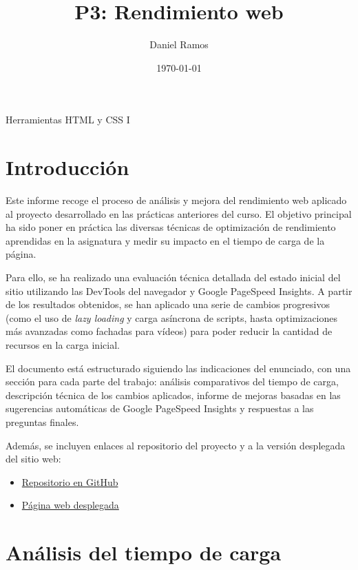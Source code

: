 \documentclass{article}
\title{P3: Rendimiento web}
\author{Daniel Ramos}
\date{\today}
\begin{document}
\maketitle

\begin{center}
    \large Herramientas HTML y CSS I
\end{center}

\newpage

\tableofcontents

\newpage

\section*{Introducción}

Este informe recoge el proceso de análisis y mejora del rendimiento web aplicado al proyecto desarrollado en las prácticas anteriores del curso. El objetivo principal ha sido poner en práctica las diversas técnicas de optimización de rendimiento aprendidas en la asignatura y medir su impacto en el tiempo de carga de la página.

Para ello, se ha realizado una evaluación técnica detallada del estado inicial del sitio utilizando las DevTools del navegador y Google PageSpeed Insights. A partir de los resultados obtenidos, se han aplicado una serie de cambios progresivos (como el uso de \textit{lazy loading} y carga asíncrona de scripts, hasta optimizaciones más avanzadas como fachadas para vídeos) para poder reducir la cantidad de recursos en la carga inicial.

El documento está estructurado siguiendo las indicaciones del enunciado, con una sección para cada parte del trabajo: análisis comparativos del tiempo de carga, descripción técnica de los cambios aplicados, informe de mejoras basadas en las sugerencias automáticas de Google PageSpeed Insights y respuestas a las preguntas finales.

Además, se incluyen enlaces al repositorio del proyecto y a la versión desplegada del sitio web:

\begin{itemize}
    \item \href{https://github.com/DanielRamosAcosta/hhyc-dramosac}{Repositorio en GitHub}
    \item \href{https://www.danielramos.me/hhyc-dramosac}{Página web desplegada}
\end{itemize}

\newpage

\section{Análisis del tiempo de carga}\label{sec:analisis-de-tiempo-de-carga}
\end{document}
